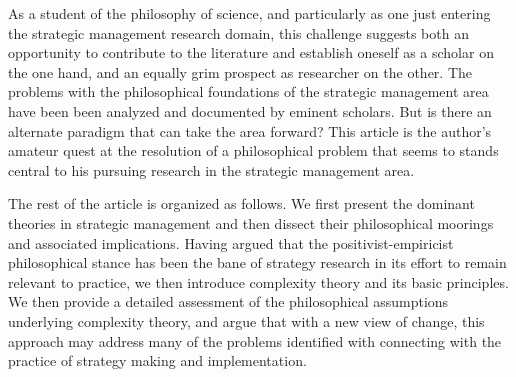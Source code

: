 \documentclass[12pt]{article}
\begin{document}
As a student of the philosophy of science, and particularly as one just entering the strategic management research domain, this challenge suggests both an opportunity to contribute to the literature and establish oneself as a scholar on the one hand, and an equally grim prospect as researcher on the other. The problems with the philosophical foundations of the strategic management area have been been analyzed and documented by eminent scholars. But is there an alternate paradigm that can take the area forward? This article is the author's amateur quest at the resolution of a philosophical problem that seems to stands central to his pursuing research in the strategic management area.

The rest of the article is organized as follows. We first present the dominant theories in strategic management and then dissect their philosophical moorings and associated implications. Having argued that the positivist-empiricist philosophical stance has been the bane of strategy research in its effort to remain relevant to practice, we then introduce complexity theory and its basic principles. We then provide a detailed assessment of the philosophical assumptions underlying complexity theory, and argue that with a new view of change, this approach may address many of the problems identified with connecting with the practice of strategy making and implementation. 
\end{document}
